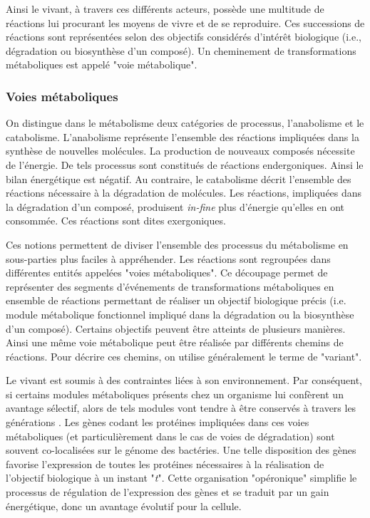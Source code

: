 \begin{refsegment}
    Ainsi le vivant, à travers ces différents acteurs, possède une multitude de réactions lui procurant les moyens de vivre et de se reproduire. Ces successions de réactions sont représentées selon des objectifs considérés d'intérêt biologique (i.e., dégradation ou biosynthèse d'un composé). Un cheminement de transformations métaboliques est appelé "voie métabolique".
    
    
    \subsubsection{Voies métaboliques}
    On distingue dans le métabolisme deux catégories de processus, l'anabolisme et le catabolisme. L'anabolisme représente l'ensemble des réactions impliquées dans la synthèse de nouvelles molécules. La production de nouveaux composés nécessite de l'énergie. De tels processus sont constitués de réactions endergoniques. Ainsi le bilan énergétique est négatif.  Au contraire, le catabolisme décrit l'ensemble des réactions nécessaire à la dégradation de molécules. Les réactions, impliquées dans la dégradation d'un composé,  produisent \textit{in-fine} plus d'énergie qu'elles en ont consommée. Ces réactions sont dites exergoniques.
    
    Ces notions permettent de diviser l'ensemble des processus du métabolisme en sous-parties plus faciles à appréhender. Les réactions sont regroupées dans différentes entités appelées "voies métaboliques". Ce découpage permet de représenter des segments d'événements de transformations métaboliques en ensemble de réactions permettant de réaliser un objectif biologique précis (i.e. module métabolique fonctionnel impliqué dans la dégradation ou la biosynthèse d'un composé). Certains objectifs peuvent être atteints de plusieurs manières. Ainsi une même voie métabolique peut être réalisée par différents chemins de réactions. Pour décrire ces chemins,  on utilise généralement le terme de "variant".
    
    Le vivant est soumis à des contraintes liées à son environnement. Par conséquent, si certains modules métaboliques présents chez un organisme lui confèrent un avantage sélectif, alors de tels modules vont tendre à être conservés à travers les générations \cite{braakman2012compositional}. Les gènes codant les protéines impliquées dans ces voies métaboliques (et particulièrement dans le cas de voies de dégradation) sont souvent co-localisées sur le génome des bactéries. Une telle disposition des gènes favorise l'expression de toutes les protéines nécessaires à la réalisation de l'objectif biologique à un instant  "\textit{t}". Cette organisation "opéronique" simplifie le processus de régulation de l'expression des gènes et se traduit par un gain énergétique, donc un avantage évolutif pour la cellule. 
    

\end{refsegment}

